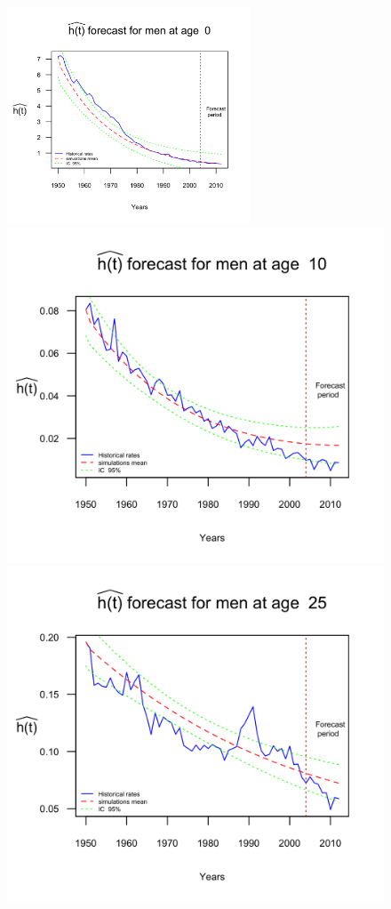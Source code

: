 \documentclass[smallextended]{svjour3}
\begin{document}
\begin{figure}[H]
    \includegraphics[width = 2.85in]{PlotMenForecast0.png}
    \includegraphics{PlotMenForecast10.png}
    \includegraphics{PlotMenForecast25.png}

\end{figure}
\end{document}
